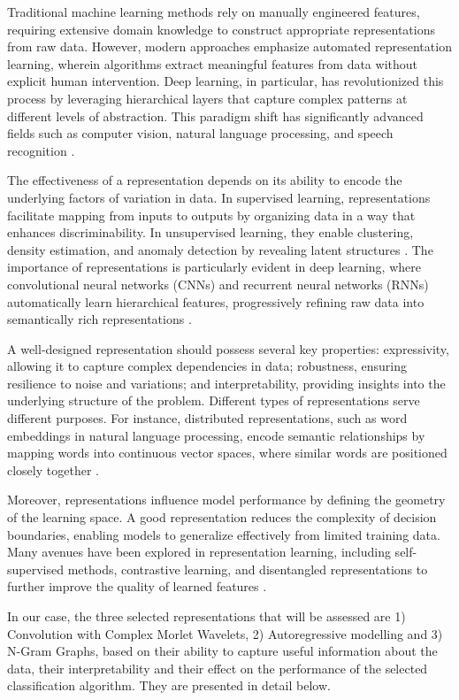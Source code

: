 \documentclass{article}
\begin{document}
Traditional machine learning methods rely on manually engineered features, requiring extensive domain knowledge to construct appropriate representations from raw data. However, modern approaches emphasize automated representation learning, wherein algorithms extract meaningful features from data without explicit human intervention. Deep learning, in particular, has revolutionized this process by leveraging hierarchical layers that capture complex patterns at different levels of abstraction. This paradigm shift has significantly advanced fields such as computer vision, natural language processing, and speech recognition \cite{lecun2015}.

The effectiveness of a representation depends on its ability to encode the underlying factors of variation in data. In supervised learning, representations facilitate mapping from inputs to outputs by organizing data in a way that enhances discriminability. In unsupervised learning, they enable clustering, density estimation, and anomaly detection by revealing latent structures \cite{yang2016}. The importance of representations is particularly evident in deep learning, where convolutional neural networks (CNNs) and recurrent neural networks (RNNs) automatically learn hierarchical features, progressively refining raw data into semantically rich representations \cite{lecun2015}.

A well-designed representation should possess several key properties: expressivity, allowing it to capture complex dependencies in data; robustness, ensuring resilience to noise and variations; and interpretability, providing insights into the underlying structure of the problem. Different types of representations serve different purposes. For instance, distributed representations, such as word embeddings in natural language processing, encode semantic relationships by mapping words into continuous vector spaces, where similar words are positioned closely together \cite{perozzi2014}.

Moreover, representations influence model performance by defining the geometry of the learning space. A good representation reduces the complexity of decision boundaries, enabling models to generalize effectively from limited training data. Many avenues have been explored in representation learning, including self-supervised methods, contrastive learning, and disentangled representations to further improve the quality of learned features  \cite{bengio2013}.

In our case, the three selected representations that will be assessed are 1) Convolution with Complex Morlet Wavelets, 2) Autoregressive modelling and 3) N-Gram Graphs, based on their ability to capture useful information about the data, their interpretability and their effect on the performance of the selected classification algorithm. They are presented in detail below.
\end{document}
